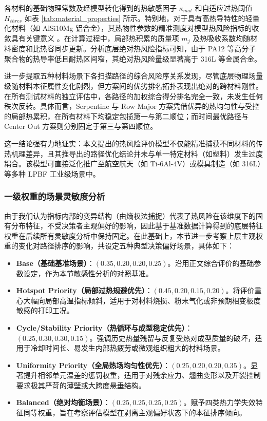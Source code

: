 \documentclass[a4paper, 12pt]{ctexart}
\begin{document}
各材料的基础物理常数及经模型转化得到的热敏感因子 $\kappa_{mat}$ 和自适应过热阈值 $H_{thres}$ 如表 \ref{tab:material_properties} 所示。特别地，对于具有高热导特性的轻量化材料（如 AlSi10Mg 铝合金），其热物性参数的精准测度对模型热风险指标的收敛具有关键意义 \cite{ref2}。在计算过程中，局部热积累的质量项 $m_j$ 及热吸收系数均随材料密度和比热容同步更新。分析底层绝对热风险指标可知，由于 PA12 等高分子聚合物的热导率低且耐热区间窄，其绝对热风险量级显著高于 316L 等金属合金。

进一步提取五种材料场景下各扫描路径的综合风险序关系发现，尽管底层物理场量级随材料本征属性变化剧烈，但方案间的优劣排名拓扑表现出绝对的跨材料刚性。在所有测试材料的独立评估中，各路径的加权综合得分排名完全一致，未发生任何秩次反转。具体而言，Serpentine 与 Row Major 方案凭借优异的热均匀性与受控的局部热累积，在所有材料下均稳定包揽第一与第二顺位；而时间最优路径与 Center Out 方案则分别固定于第三与第四顺位。

这一结论强有力地证实：本文提出的热风险评价模型不仅能精准捕获不同材料的传热机理差异，且其推导出的路径优化结论并未与单一特定材料（如塑料）发生过度耦合。该模型可直接泛化推广至航空航天（如 Ti-6Al-4V）或模具制造（如 316L）等多种 LPBF 工业级场景中。


\subsubsection{一级权重的场景灵敏度分析}
由于我们认为指标内部的变异结构（由熵权法捕捉）代表了热风险在该维度下的固有分布特征，不受决策者主观偏好的影响，因此基于基准数据计算得到的底层特征权重在后续所有灵敏度分析中保持固定。在此基础上，本节进一步考察上层主观权重的变化对路径排序的影响，共设定五种典型决策偏好场景，具体如下：

\begin{itemize}
    \item \textbf{Base（基础基准场景）}：$(0.35, 0.20, 0.20, 0.25)$。沿用正文综合评价的基础参数设定，作为本节敏感性分析的对照基准。
    \item \textbf{Hotspot Priority（局部过热规避优先）}：$(0.45, 0.20, 0.15, 0.20)$。将评价重心大幅向局部高温指标倾斜，适用于对材料烧损、粉末气化或非预期相变极度敏感的打印工况。
    \item \textbf{Cycle/Stability Priority（热循环与成型稳定优先）}：$(0.25, 0.30, 0.30, 0.15)$。强调历史热量残留与反复受热对成型质量的破坏，适用于冷却时间长、易发生内部热疲劳或微观组织粗大的材料场景。
    \item \textbf{Uniformity Priority（全局热场均匀性优先）}：$(0.25, 0.20, 0.20, 0.35)$。显著提升相邻单元温差的惩罚权重，适用于对残余应力、翘曲变形以及开裂控制要求极其严苛的薄壁或大跨度悬垂结构。
    \item \textbf{Balanced（绝对均衡场景）}：$(0.25, 0.25, 0.25, 0.25)$。赋予四类热力学失效特征同等权重，旨在考察评估模型在剥离主观偏好状态下的本征排序倾向。
\end{itemize}
\end{document}
